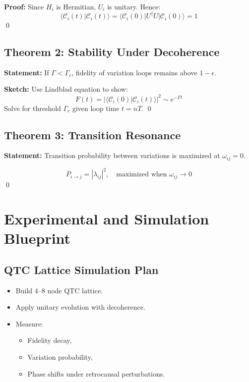\documentclass{article}
\theoremstyle{plain}
\theoremstyle{claimstyle}
\begin{document}
\textbf{Proof:} Since \( H_i \) is Hermitian, \( U_i \) is unitary. Hence:
\begin{equation}
\langle \mathcal{C}_i(t) | \mathcal{C}_i(t) \rangle = \langle \mathcal{C}_i(0) | U^\dagger U | \mathcal{C}_i(0) \rangle = 1
\end{equation}
\qed

\subsection*{Theorem 2: Stability Under Decoherence}
\textbf{Statement:} If \( \Gamma < \Gamma_c \), fidelity of variation loops remains above \( 1 - \epsilon \).

\textbf{Sketch:} Use Lindblad equation to show:
\begin{equation}
F(t) = |\langle \mathcal{C}_i(0) | \mathcal{C}_i(t) \rangle|^2 \sim e^{-\Gamma t}
\end{equation}
Solve for threshold \( \Gamma_c \) given loop time \( t = nT \). \qed

\subsection*{Theorem 3: Transition Resonance}
\textbf{Statement:} Transition probability between variations is maximized at \( \omega_{ij} = 0 \).

\begin{equation}
P_{i \to j} = |\lambda_{ij}|^2, \quad \text{maximized when } \omega_{ij} \to 0
\end{equation}
\qed

\section{Experimental and Simulation Blueprint}

\subsection{QTC Lattice Simulation Plan}
\begin{itemize}
    \item Build 4–8 node QTC lattice.
    \item Apply unitary evolution with decoherence.
    \item Measure:
    \begin{itemize}
        \item Fidelity decay,
        \item Variation probability,
        \item Phase shifts under retrocausal perturbations.
    \end{itemize}
\end{itemize}
\end{document}
